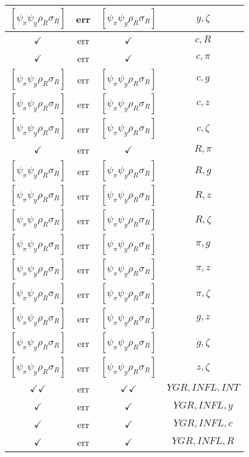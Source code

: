 \documentclass[a4paper,10pt]{article}
\begin{document}
\begin{longtable}{|c|c|c|c|}
$[\psi_\pi \psi_y \rho_R \sigma_R ]$ & err & $[\psi_\pi \psi_y \rho_R \sigma_R ]$ & ${y},{\zeta}$ \\
\hline
$\checkmark$ & err & $\checkmark$ & ${c},{R}$ \\
\hline
$\checkmark$ & err & $\checkmark$ & ${c},{\pi}$ \\
\hline
$[\psi_\pi \psi_y \rho_R \sigma_R ]$ & err & $[\psi_\pi \psi_y \rho_R \sigma_R ]$ & ${c},{g}$ \\
\hline
$[\psi_\pi \psi_y \rho_R \sigma_R ]$ & err & $[\psi_\pi \psi_y \rho_R \sigma_R ]$ & ${c},{z}$ \\
\hline
$[\psi_\pi \psi_y \rho_R \sigma_R ]$ & err & $[\psi_\pi \psi_y \rho_R \sigma_R ]$ & ${c},{\zeta}$ \\
\hline
$\checkmark$ & err & $\checkmark$ & ${R},{\pi}$ \\
\hline
$[\psi_\pi \psi_y \rho_R \sigma_R ]$ & err & $[\psi_\pi \psi_y \rho_R \sigma_R ]$ & ${R},{g}$ \\
\hline
$[\psi_\pi \psi_y \rho_R \sigma_R ]$ & err & $[\psi_\pi \psi_y \rho_R \sigma_R ]$ & ${R},{z}$ \\
\hline
$[\psi_\pi \psi_y \rho_R \sigma_R ]$ & err & $[\psi_\pi \psi_y \rho_R \sigma_R ]$ & ${R},{\zeta}$ \\
\hline
$[\psi_\pi \psi_y \rho_R \sigma_R ]$ & err & $[\psi_\pi \psi_y \rho_R \sigma_R ]$ & ${\pi},{g}$ \\
\hline
$[\psi_\pi \psi_y \rho_R \sigma_R ]$ & err & $[\psi_\pi \psi_y \rho_R \sigma_R ]$ & ${\pi},{z}$ \\
\hline
$[\psi_\pi \psi_y \rho_R \sigma_R ]$ & err & $[\psi_\pi \psi_y \rho_R \sigma_R ]$ & ${\pi},{\zeta}$ \\
\hline
$[\psi_\pi \psi_y \rho_R \sigma_R ]$ & err & $[\psi_\pi \psi_y \rho_R \sigma_R ]$ & ${g},{z}$ \\
\hline
$[\psi_\pi \psi_y \rho_R \sigma_R ]$ & err & $[\psi_\pi \psi_y \rho_R \sigma_R ]$ & ${g},{\zeta}$ \\
\hline
$[\psi_\pi \psi_y \rho_R \sigma_R ]$ & err & $[\psi_\pi \psi_y \rho_R \sigma_R ]$ & ${z},{\zeta}$ \\
\hline
$\checkmark\checkmark$ & err & $\checkmark\checkmark$ & ${YGR},{INFL},{INT}$ \\
\hline
$\checkmark$ & err & $\checkmark$ & ${YGR},{INFL},{y}$ \\
\hline
$\checkmark$ & err & $\checkmark$ & ${YGR},{INFL},{c}$ \\
\hline
$\checkmark$ & err & $\checkmark$ & ${YGR},{INFL},{R}$ \\

\end{longtable}
\end{document}
